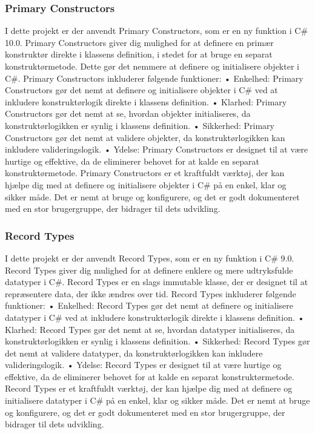 \subsubsection{Primary Constructors}
I dette projekt er der anvendt Primary Constructors, som er en ny funktion i C\# 10.0. Primary Constructors giver dig mulighed for at definere en primær konstruktør direkte i klassens definition, i stedet for at bruge en separat konstruktørmetode. Dette gør det nemmere at definere og initialisere objekter i C\#.
Primary Constructors inkluderer følgende funktioner:
•	Enkelhed: Primary Constructors gør det nemt at definere og initialisere objekter i C\# ved at inkludere konstruktørlogik direkte i klassens definition.
•	Klarhed: Primary Constructors gør det nemt at se, hvordan objekter initialiseres, da konstruktørlogikken er synlig i klassens definition.
•	Sikkerhed: Primary Constructors gør det nemt at validere objekter, da konstruktørlogikken kan inkludere valideringslogik.
•	Ydelse: Primary Constructors er designet til at være hurtige og effektive, da de eliminerer behovet for at kalde en separat konstruktørmetode.
Primary Constructors er et kraftfuldt værktøj, der kan hjælpe dig med at definere og initialisere objekter i C\# på en enkel, klar og sikker måde. Det er nemt at bruge og konfigurere, og det er godt dokumenteret med en stor brugergruppe, der bidrager til dets udvikling.

\subsubsection{Record Types}
I dette projekt er der anvendt Record Types, som er en ny funktion i C\# 9.0. Record Types giver dig mulighed for at definere enklere og mere udtryksfulde datatyper i C\#. Record Types er en slags immutable klasse, der er designet til at repræsentere data, der ikke ændres over tid.
Record Types inkluderer følgende funktioner:
•	Enkelhed: Record Types gør det nemt at definere og initialisere datatyper i C\# ved at inkludere konstruktørlogik direkte i klassens definition.
•	Klarhed: Record Types gør det nemt at se, hvordan datatyper initialiseres, da konstruktørlogikken er synlig i klassens definition.
•	Sikkerhed: Record Types gør det nemt at validere datatyper, da konstruktørlogikken kan inkludere valideringslogik.
•	Ydelse: Record Types er designet til at være hurtige og effektive, da de eliminerer behovet for at kalde en separat konstruktørmetode.
Record Types er et kraftfuldt værktøj, der kan hjælpe dig med at definere og initialisere datatyper i C\# på en enkel, klar og sikker måde. Det er nemt at bruge og konfigurere, og det er godt dokumenteret med en stor brugergruppe, der bidrager til dets udvikling.

